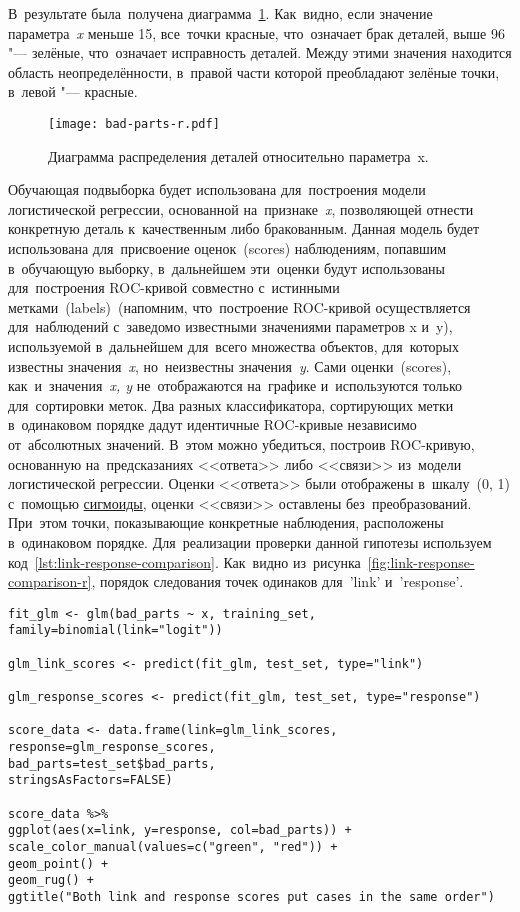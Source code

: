 \documentclass[]{scrreprt}
\begin{document}
В~результате была~получена диаграмма~\ref{fig:bad-parts-r}. Как~видно, если значение параметра~\emph{x} меньше 15, все~точки красные, что~означает брак деталей, выше 96 "--- зелёные, что~означает исправность деталей. Между этими значения находится область неопределённости, в~правой части которой преобладают зелёные точки, в~левой "--- красные.
%
\begin{figure}[ht]
	\centering
	\texttt{[image: bad-parts-r.pdf]}
	\caption{Диаграмма распределения деталей относительно параметра~x.}
	\label{fig:bad-parts-r}
\end{figure}
%

Обучающая подвыборка будет использована для~построения модели логистической регрессии, основанной на~признаке~\emph{x}, позволяющей отнести конкретную деталь к~качественным либо бракованным. Данная модель будет использована для~присвоение оценок~(\foreignlanguage{english}{scores}) наблюдениям, попавшим в~обучающую выборку, в~дальнейшем эти~оценки будут использованы для~построения ROC-кривой совместно с~истинными метками~(\foreignlanguage{english}{labels})~(напомним, что~построение ROC-кривой осуществляется для~наблюдений с~заведомо известными значениями параметров x и~y), используемой в~дальнейшем для~всего множества объектов, для~которых известны значения~\emph{x}, но~неизвестны значения~\emph{y}. Сами оценки~(\foreignlanguage{english}{scores}), как~и~значения~\emph{x, y} не~отображаются на~графике и~используются только для~сортировки меток. Два разных классификатора, сортирующих метки в~одинаковом порядке дадут идентичные ROC-кривые независимо от~абсолютных значений. В~этом можно убедиться, построив ROC-кривую, основанную на~предсказаниях <<ответа>> либо <<связи>> из~модели логистической регрессии. Оценки <<ответа>> были отображены в~шкалу~(0, 1) с~помощью \href{https://en.wikipedia.org/wiki/Sigmoid_function}{сигмоиды}\cite{Wiki:sigmoid-function}, оценки <<связи>> оставлены без~преобразований. При~этом точки, показывающие конкретные наблюдения, расположены в~одинаковом порядке. Для~реализации проверки данной гипотезы используем код~\ref{lst:link-response-comparison}. Как~видно из~рисунка~\ref{fig:link-response-comparison-r}, порядок следования точек одинаков для~\foreignlanguage{english}{'link'} и~\foreignlanguage{english}{'response'}.
%
\begin{lstlisting}[float, caption = Сравнение предсказаний типов 'link' и~'response', firstnumber=1, label= lst:link-response-comparison]
fit_glm <- glm(bad_parts ~ x, training_set, family=binomial(link="logit"))

glm_link_scores <- predict(fit_glm, test_set, type="link")

glm_response_scores <- predict(fit_glm, test_set, type="response")

score_data <- data.frame(link=glm_link_scores, 
response=glm_response_scores,
bad_parts=test_set$bad_parts,
stringsAsFactors=FALSE)

score_data %>% 
ggplot(aes(x=link, y=response, col=bad_parts)) + 
scale_color_manual(values=c("green", "red")) + 
geom_point() + 
geom_rug() + 
ggtitle("Both link and response scores put cases in the same order")

\end{lstlisting}
\end{document}
